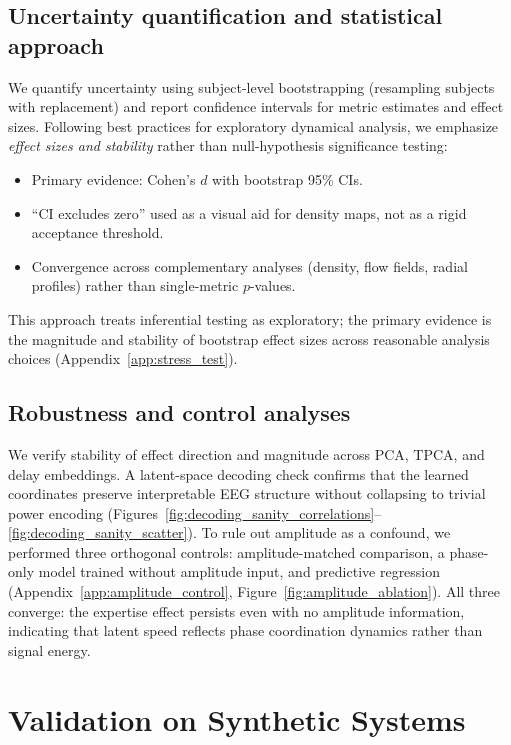 \documentclass[5p,twocolumn,authoryear]{elsarticle}
\begin{document}
\subsection{Uncertainty quantification and statistical approach}
We quantify uncertainty using subject-level bootstrapping (resampling subjects with replacement) and report confidence intervals for metric estimates and effect sizes. Following best practices for exploratory dynamical analysis, we emphasize \emph{effect sizes and stability} rather than null-hypothesis significance testing:
\begin{itemize}
    \item Primary evidence: Cohen's $d$ with bootstrap 95\% CIs.
    \item ``CI excludes zero'' used as a visual aid for density maps, not as a rigid acceptance threshold.
    \item Convergence across complementary analyses (density, flow fields, radial profiles) rather than single-metric $p$-values.
\end{itemize}
This approach treats inferential testing as exploratory; the primary evidence is the magnitude and stability of bootstrap effect sizes across reasonable analysis choices (Appendix~\ref{app:stress_test}).

\subsection{Robustness and control analyses}
We verify stability of effect direction and magnitude across PCA, TPCA, and delay embeddings. A latent-space decoding check confirms that the learned coordinates preserve interpretable EEG structure without collapsing to trivial power encoding (Figures~\ref{fig:decoding_sanity_correlations}--\ref{fig:decoding_sanity_scatter}). To rule out amplitude as a confound, we performed three orthogonal controls: amplitude-matched comparison, a phase-only model trained without amplitude input, and predictive regression (Appendix~\ref{app:amplitude_control}, Figure~\ref{fig:amplitude_ablation}). All three converge: the expertise effect persists even with no amplitude information, indicating that latent speed reflects phase coordination dynamics rather than signal energy.

\section{Validation on Synthetic Systems}
\end{document}
